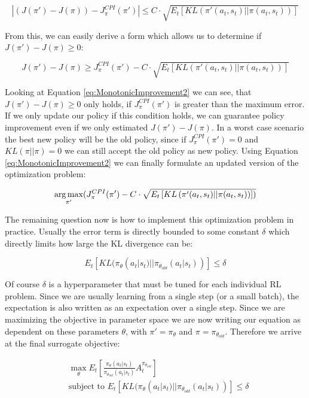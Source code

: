 \[|(J(\pi') - J(\pi)) - J^{CPI}_\pi(\pi')| \leq C \cdot \sqrt{E_t\left[KL\left(\pi'(a_t, s_t)||\pi(a_t, s_t)\right)\right]}\]

From this, we can easily derive a form which allows us to determine if $J(\pi') - J(\pi) \geq 0$:

\begin{equation} \label{eq:MonotonicImprovement2}
  J(\pi') - J(\pi) \geq J^{CPI}_\pi(\pi') - C \cdot \sqrt{E_t\left[KL\left(\pi'(a_t, s_t)||\pi(a_t, s_t)\right)\right]}
\end{equation}

Looking at Equation \ref{eq:MonotonicImprovement2} we can see, that $J(\pi') - J(\pi) \geq 0$ only holds, if $J^{CPI}_\pi(\pi')$ is greater than the maximum error. If we only update our policy if this condition holds, we can guarantee policy improvement even if we only estimated $J(\pi') - J(\pi)$. In a worst case scenario the best new policy will be the old policy, since if $J^{CPI}_\pi(\pi') = 0$ and $KL(\pi||\pi) = 0$ we can still accept the old policy as new policy. Using Equation \ref{eq:MonotonicImprovement2} we can finally formulate an updated version of the optimization problem:

\[\operatorname*{arg\,max}_{\pi'}(J^{CPI}_\pi(\pi') - C \cdot \sqrt{E_t\left[KL\left(\pi'(a_t, s_t)||\pi(a_t, s_t)\right)\right])}\]

The remaining question now is how to implement this optimization problem in practice. Usually the error term is directly bounded to some constant $\delta$ which directly limits how large the KL divergence can be:

\[E_t[KL(\pi_\theta(a_t|s_t)||\pi_{\theta_{old}}(a_t|s_t))] \leq \delta\]

Of course $\delta$ is a hyperparameter that must be tuned for each individual RL problem. Since we are usually learning from a single step (or a small batch), the expectation is also written as an expectation over a single step. Since we are maximizing the objective in parameter space we are now writing our equation as dependent on these parameters $\theta$, with $\pi' = \pi_\theta$ and $\pi = \pi_{\theta_{old}}$. Therefore we arrive at the final surrogate objective:

\begin{align*}
  &\max_\theta E_t\left[\frac{\pi_\theta(a_t|s_t)}{\pi_{\theta_{old}}(a_t|s_t)}A_t^{\pi_{\theta_{old}}} \right] \\
  &\text{subject to } E_t[KL(\pi_\theta(a_t|s_t)||\pi_{\theta_{old}}(a_t|s_t))] \leq \delta
\end{align*}

